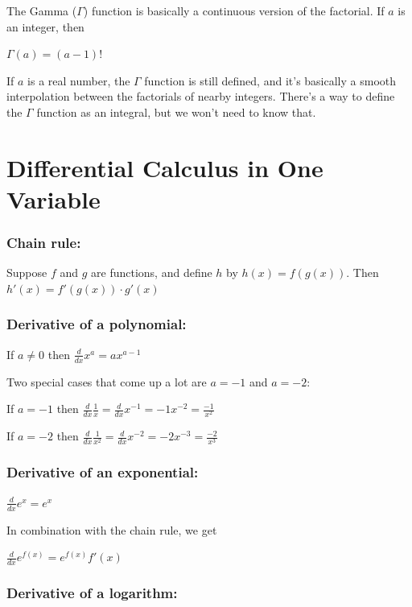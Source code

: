 \documentclass[]{article}
\begin{document}
The Gamma (\(\Gamma\)) function is basically a continuous version of the
factorial. If \(a\) is an integer, then

\(\Gamma(a) = (a-1)!\)

If \(a\) is a real number, the \(\Gamma\) function is still defined, and
it's basically a smooth interpolation between the factorials of nearby
integers. There's a way to define the \(\Gamma\) function as an
integral, but we won't need to know that.

\newpage

\section{Differential Calculus in One
Variable}\label{differential-calculus-in-one-variable}

\subsubsection{Chain rule:}\label{chain-rule}

Suppose \(f\) and \(g\) are functions, and define \(h\) by
\(h(x) = f(g(x))\). Then \(h'(x) = f'(g(x)) \cdot g'(x)\)

\subsubsection{Derivative of a
polynomial:}\label{derivative-of-a-polynomial}

If \(a \neq 0\) then \(\frac{d}{dx} x^a = a x^{a-1}\)

Two special cases that come up a lot are \(a = -1\) and \(a = -2\):

If \(a = -1\) then
\(\frac{d}{dx} \frac{1}{x} = \frac{d}{dx} x^{-1} = -1 x^{-2} = \frac{-1}{x^2}\)

If \(a = -2\) then
\(\frac{d}{dx} \frac{1}{x^2} = \frac{d}{dx} x^{-2} = -2 x^{-3} = \frac{-2}{x^3}\)

\subsubsection{Derivative of an
exponential:}\label{derivative-of-an-exponential}

\(\frac{d}{dx} e^{x} = e^x\)

In combination with the chain rule, we get

\(\frac{d}{dx} e^{f(x)} = e^{f(x)} f'(x)\)

\subsubsection{Derivative of a
logarithm:}\label{derivative-of-a-logarithm}
\end{document}

